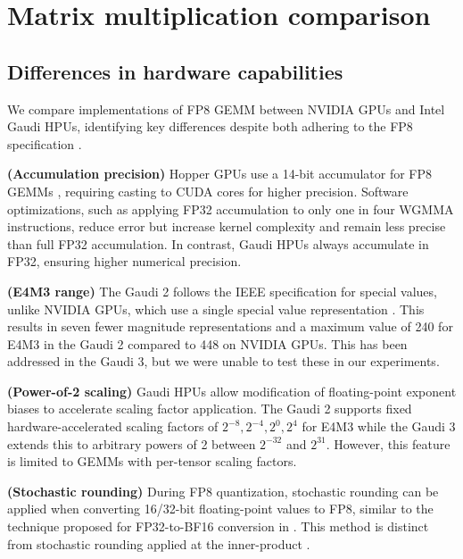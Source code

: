 \section{Matrix multiplication comparison}\label{sec:matmul}

\subsection{Differences in hardware capabilities}

We compare implementations of FP8 GEMM between NVIDIA GPUs and Intel Gaudi HPUs, identifying key differences despite both adhering to the FP8 specification \citep{micikevicius2022fp8formatsdeeplearning}.

\textbf{(Accumulation precision)} Hopper GPUs use a 14-bit accumulator for FP8 GEMMs \citep{deepseekai2024deepseekv3technicalreport}, requiring casting to CUDA cores for higher precision. Software optimizations, such as applying FP32 accumulation to only one in four WGMMA instructions, reduce error but increase kernel complexity and remain less precise than full FP32 accumulation. In contrast, Gaudi HPUs always accumulate in FP32, ensuring higher numerical precision.

\textbf{(E4M3 range)} The Gaudi 2 follows the IEEE specification for special values, unlike NVIDIA GPUs, which use a single special value representation \citep{noune20228bitnumericalformatsdeep}. This results in seven fewer magnitude representations and a maximum value of 240 for E4M3 in the Gaudi 2 compared to 448 on NVIDIA GPUs. This has been addressed in the Gaudi 3, but we were unable to test these in our experiments.

\textbf{(Power-of-2 scaling)} Gaudi HPUs allow modification of floating-point exponent biases to accelerate scaling factor application. The Gaudi 2 supports fixed hardware-accelerated scaling factors of  $2^{-8}, 2^{-4}, 2^{0}, 2^{4}$ for E4M3 while the Gaudi 3 extends this to arbitrary powers of 2 between $2^{-32}$ and $2^{31}$. However, this feature is limited to GEMMs with per-tensor scaling factors.

\textbf{(Stochastic rounding)} During FP8 quantization, stochastic rounding can be applied when converting 16/32-bit floating-point values to FP8, similar to the technique proposed for FP32-to-BF16 conversion in \citep{hlat}. This method is distinct from stochastic rounding applied at the inner-product \citep{doi:10.1137/22M1510819}.

